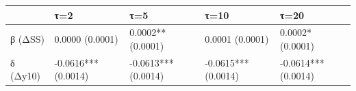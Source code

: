 \begin{tabular}{lllll}
\toprule
 & τ=2 & τ=5 & τ=10 & τ=20 \\
\midrule
β (ΔSS) & 0.0000
(0.0001) & 0.0002**
(0.0001) & 0.0001
(0.0001) & 0.0002*
(0.0001) \\
δ (Δy10) & -0.0616***
(0.0014) & -0.0613***
(0.0014) & -0.0615***
(0.0014) & -0.0614***
(0.0014) \\
\bottomrule
\end{tabular}
